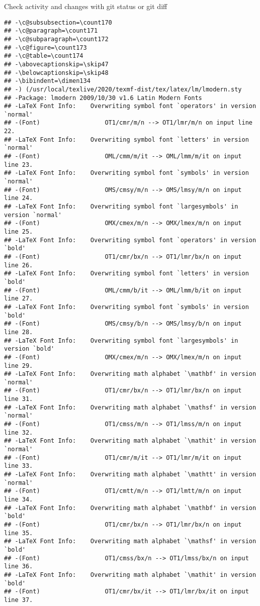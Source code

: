 \documentclass[ignorenonframetext,]{beamer}
\begin{document}
\begin{frame}[fragile]{Check activity and changes with git status or git
diff}
\begin{verbatim}
## -\c@subsubsection=\count170
## -\c@paragraph=\count171
## -\c@subparagraph=\count172
## -\c@figure=\count173
## -\c@table=\count174
## -\abovecaptionskip=\skip47
## -\belowcaptionskip=\skip48
## -\bibindent=\dimen134
## -) (/usr/local/texlive/2020/texmf-dist/tex/latex/lm/lmodern.sty
## -Package: lmodern 2009/10/30 v1.6 Latin Modern Fonts
## -LaTeX Font Info:    Overwriting symbol font `operators' in version `normal'
## -(Font)                  OT1/cmr/m/n --> OT1/lmr/m/n on input line 22.
## -LaTeX Font Info:    Overwriting symbol font `letters' in version `normal'
## -(Font)                  OML/cmm/m/it --> OML/lmm/m/it on input line 23.
## -LaTeX Font Info:    Overwriting symbol font `symbols' in version `normal'
## -(Font)                  OMS/cmsy/m/n --> OMS/lmsy/m/n on input line 24.
## -LaTeX Font Info:    Overwriting symbol font `largesymbols' in version `normal'
## -(Font)                  OMX/cmex/m/n --> OMX/lmex/m/n on input line 25.
## -LaTeX Font Info:    Overwriting symbol font `operators' in version `bold'
## -(Font)                  OT1/cmr/bx/n --> OT1/lmr/bx/n on input line 26.
## -LaTeX Font Info:    Overwriting symbol font `letters' in version `bold'
## -(Font)                  OML/cmm/b/it --> OML/lmm/b/it on input line 27.
## -LaTeX Font Info:    Overwriting symbol font `symbols' in version `bold'
## -(Font)                  OMS/cmsy/b/n --> OMS/lmsy/b/n on input line 28.
## -LaTeX Font Info:    Overwriting symbol font `largesymbols' in version `bold'
## -(Font)                  OMX/cmex/m/n --> OMX/lmex/m/n on input line 29.
## -LaTeX Font Info:    Overwriting math alphabet `\mathbf' in version `normal'
## -(Font)                  OT1/cmr/bx/n --> OT1/lmr/bx/n on input line 31.
## -LaTeX Font Info:    Overwriting math alphabet `\mathsf' in version `normal'
## -(Font)                  OT1/cmss/m/n --> OT1/lmss/m/n on input line 32.
## -LaTeX Font Info:    Overwriting math alphabet `\mathit' in version `normal'
## -(Font)                  OT1/cmr/m/it --> OT1/lmr/m/it on input line 33.
## -LaTeX Font Info:    Overwriting math alphabet `\mathtt' in version `normal'
## -(Font)                  OT1/cmtt/m/n --> OT1/lmtt/m/n on input line 34.
## -LaTeX Font Info:    Overwriting math alphabet `\mathbf' in version `bold'
## -(Font)                  OT1/cmr/bx/n --> OT1/lmr/bx/n on input line 35.
## -LaTeX Font Info:    Overwriting math alphabet `\mathsf' in version `bold'
## -(Font)                  OT1/cmss/bx/n --> OT1/lmss/bx/n on input line 36.
## -LaTeX Font Info:    Overwriting math alphabet `\mathit' in version `bold'
## -(Font)                  OT1/cmr/bx/it --> OT1/lmr/bx/it on input line 37.

\end{verbatim}
\end{frame}
\end{document}
